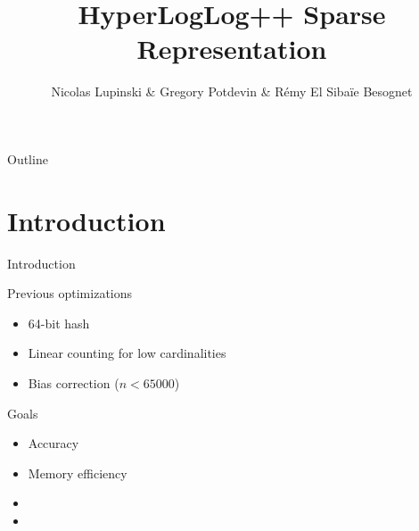 \documentclass{beamer}
\title{HyperLogLog++ Sparse Representation}
\author{Nicolas Lupinski \& Gregory Potdevin \& Rémy El Sibaïe Besognet}
\begin{document}
\begin{frame}
  \titlepage  
\end{frame}

\begin{frame}{Outline}
  \tableofcontents
\end{frame}


\section{Introduction}
\begin{frame}{Introduction}

  \begin{block}{Previous optimizations}
    \begin{itemize}
      \item 64-bit hash
      \item Linear counting for low cardinalities
      \item Bias correction ($n < 65000$)
    \end{itemize}
  \end{block}


  \begin{block}{Goals}
    \begin{itemize}
      \item Accuracy
      \item Memory efficiency
      \item {} 
      \item {} 
    \end{itemize}
  \end{block}

\end{frame}

\end{document}
